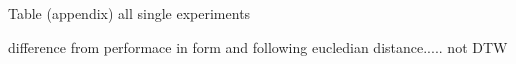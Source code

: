 Table (appendix) all single experiments


difference from performace in form and following eucledian distance..... not DTW